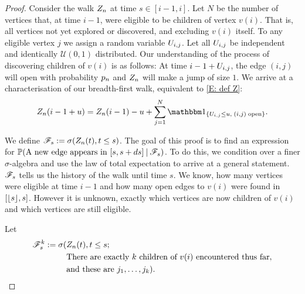 \begin{proof} \label{P: formula an}
	Consider the walk $Z_n$ at time $s\in[i-1, i]$.
	Let $N$ be the number of vertices that, at time $i-1$, were eligible to be children of vertex $v(i)$.
	That is, all vertices not yet explored or discovered, and excluding $v(i)$ itself.
	To any eligible vertex $j$ we assign a random variable $U_{i,j}$.
	Let all $U_{i,j}$ be independent and identically $\mathcal{U}(0,1)$ distributed.
	Our understanding of the process of discovering children of $v(i)$ is as follows:
	At time $i-1+U_{i,j}$, the edge $(i,j)$ will open with probability $p_n$ and
	$Z_n$ will make a jump of size $1$.
	We arrive at a characterisation of our breadth-first walk, 
	equivalent to \eqref{E: def Z}:	
	\begin{equation}
	\Zn(i-1+u) = \Zn(i-1) - u + \sum_{j=1}^{N} \Ind{\{\Uij \leq u, \; (i,j) \; \text{open}\}}.
	\end{equation}
	
	We define $\mathscr{F}_s := \sigma(Z_n(t), t\leq s)$.
	The goal of this proof is to find an expression for
	$\mathbb{P}(\text{A new edge appears in $[s, s+ds]$} \: | \: \mathscr{F}_s)$.
	To do this, we condition over a finer $\sigma$-algebra and use the law of total expectation to arrive at a general statement.
	$\mathscr{F}_s$ tells us the history of the walk until time $s$. 
	We know, how many vertices were eligible at time $i-1$ and how many open edges to $v(i)$ were found in $[\lfloor s\rfloor,s]$.
	However it is unknown, exactly which vertices are now children of $v(i)$ and which vertices are still eligible.
	
	Let 
	\begin{equation}
	\begin{split}
	\mathscr{F}_s^k := \sigma(&Z_n(t), t\leq s; \\
	&\text{There are exactly $k$ children of $v(i)$ encountered thus far}, \\
	&\text{and these are $j_1, \dots, j_k$}).
	\end{split}
	\end{equation}
	

\end{proof}
